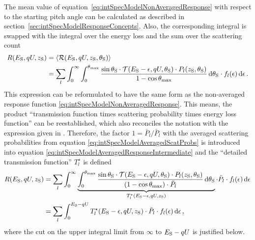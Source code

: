 The mean value of equation~\eqref{eq:intSpecModelNonAveragedResponse} with respect to the starting pitch angle can be calculated as described in section~\ref{sec:intSpecModelResponseConcepts}. Also, the corresponding integral is swapped with the integral over the energy loss and the sum over the scattering count
\begin{align}
\label{eq:intSpecModelAveragedResponseIntermediate}
R(E_\mathrm{S}, qU, z_\mathrm{S}) &= 
\left\langle{\mathcal{R}(E_\mathrm{S}, qU, z_\mathrm{S}, \theta_\mathrm{S})}\right\rangle \nonumber\\ &=
\sum_{l}
	\int_{0}^{\infty}
	\int_{0}^{\theta_\mathrm{max}}
		\frac{
			\sin\theta_\mathrm{S} \cdot
			\mathcal{T}(E_\mathrm{S}-\epsilon, qU, \theta_\mathrm{S}) \cdot P_l(z_\mathrm{S}, \theta_\mathrm{S})
		}{
			1-\cos\theta_\mathrm{max}
		}
	\mathop{}\!\mathrm{d} \theta_\mathrm{S}
	\cdot f_l(\epsilon)
	\mathop{}\!\mathrm{d} \epsilon
\text{\,.}
\end{align}
This expression can be reformulated to have the same form as the non-averaged response function \eqref{eq:intSpecModelNonAveragedResponse}. This means, the product ``transmission function times scattering probability times energy loss function'' can be reestablished, which also reconciles the notation  with the expression given in \cite{Groh2015}. Therefore, the factor $1=\bar{P}_l/\bar{P}_l$ with the averaged scattering probabilities from equation \eqref{eq:intSpecModelAveragedScatProbs} is introduced into equation \eqref{eq:intSpecModelAveragedResponseIntermediate} and the ``detailed transmission function'' $T_l^{\star}$ is defined
\begin{align}
	R(E_\mathrm{S}, qU, z_\mathrm{S}) &=
	\sum_{l}
	\int_{0}^{\infty}
	\underbrace{
		\int_{0}^{\theta_\mathrm{max}}
		\frac{
			\sin\theta_\mathrm{S} \cdot
			\mathcal{T}(E_\mathrm{S}-\epsilon, qU, \theta_\mathrm{S}) \cdot P_l(z_\mathrm{S}, \theta_\mathrm{S})
		}{
			(1-\cos\theta_\mathrm{max}) \cdot \bar{P}_l \vphantom{\large A}
		}
		\mathop{}\!\mathrm{d} \theta_\mathrm{S}
	}_{
		T_l^{\star}(E_\mathrm{S}-\epsilon,qU,z_\mathrm{S})
	}
	\cdot \bar{P}_l \cdot f_l(\epsilon)
	\mathop{}\!\mathrm{d} \epsilon \nonumber \\ &=
	\label{eq:intSpecModelFullResponseIntermediate}
	\sum_{l}
	\int_{0}^{E_\mathrm{S}-qU}
	T_l^{\star}(E_\mathrm{S}-\epsilon,qU,z_\mathrm{S})
	\cdot \bar{P}_l \cdot f_l(\epsilon)
	\mathop{}\!\mathrm{d} \epsilon
	\text{\,,}
\end{align}
where the cut on the upper integral limit from $\infty$ to $E_\mathrm{S}-qU$ is justified below.

